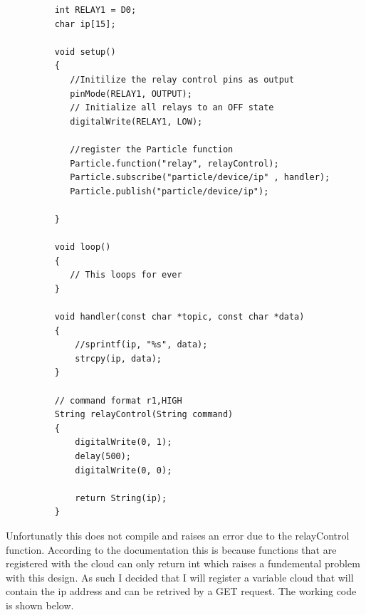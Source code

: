 \documentclass{article}
\begin{document}
\begin{figure}[h]
    \begin{lstlisting}
    int RELAY1 = D0;
    char ip[15];

    void setup()
    {
       //Initilize the relay control pins as output
       pinMode(RELAY1, OUTPUT);
       // Initialize all relays to an OFF state
       digitalWrite(RELAY1, LOW);

       //register the Particle function
       Particle.function("relay", relayControl);
       Particle.subscribe("particle/device/ip" , handler);
       Particle.publish("particle/device/ip");

    }

    void loop()
    {
       // This loops for ever
    }

    void handler(const char *topic, const char *data)
    {
        //sprintf(ip, "%s", data);
        strcpy(ip, data);
    }

    // command format r1,HIGH
    String relayControl(String command)
    {
        digitalWrite(0, 1);
        delay(500);
        digitalWrite(0, 0);

        return String(ip);
    }
    \end{lstlisting}
\end{figure}

Unfortunatly this does not compile and raises an error due to the relayControl function.
According to the documentation this is because functions that are registered with the
cloud can only return int which raises a fundemental problem with this design. As such
I decided that I will register a variable cloud that will contain the ip address and can
be retrived by a GET request. The working code is shown below.
\end{document}
